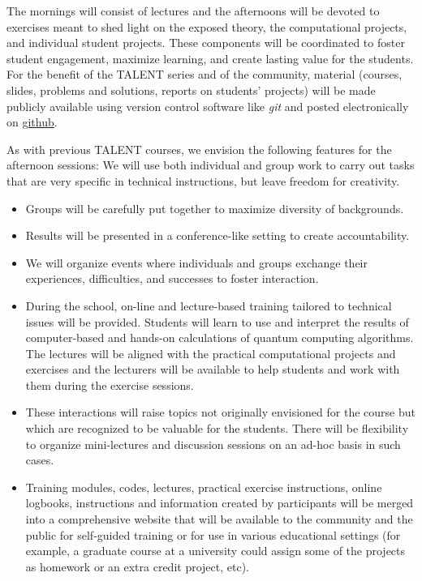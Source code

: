 \documentclass[superscriptaddress,amsmath,amssymb,aps,floatfix]{revtex4-2}
\begin{document}
The mornings will consist of lectures and the afternoons will be devoted
to exercises meant to shed light on the exposed theory, the
computational projects, and individual student projects. These components
will be coordinated to foster student engagement, maximize learning, and
create lasting value for the students. For the benefit of the TALENT
series and of the community, material (courses, slides, problems and
solutions, reports on students' projects) will be made publicly
available using version control software like \emph{git} and posted
electronically on \href{https://github.com}{github}.

As with previous TALENT courses, we envision the following features for
the afternoon sessions: We will use both individual and group work to
carry out tasks that are very specific in technical instructions, but
leave freedom for creativity.

\begin{itemize}
\item
  Groups will be carefully put together to maximize diversity of
  backgrounds.
\item
  Results will be presented in a conference-like setting to create
  accountability.
\item
  We will organize events where individuals and groups exchange their
  experiences, difficulties, and successes to foster interaction.
\item
  During the school, on-line and lecture-based training tailored to
  technical issues will be provided. Students will learn to use and
  interpret the results of computer-based and hands-on calculations of
  quantum computing algorithms. The lectures will be aligned with the
  practical computational projects and exercises and the lecturers will
  be available to help students and work with them during the exercise
  sessions.
\item
  These interactions will raise topics not originally envisioned for the
  course but which are recognized to be valuable for the students. There
  will be flexibility to organize mini-lectures and discussion sessions
  on an ad-hoc basis in such cases.

\item
  Training modules, codes, lectures, practical exercise instructions,
  online logbooks, instructions and information created by participants
  will be merged into a comprehensive website that will be available to
  the community and the public for self-guided training or for use in
  various educational settings (for example, a graduate course at a
  university could assign some of the projects as homework or an extra
  credit project, etc).
\end{itemize}
\end{document}
